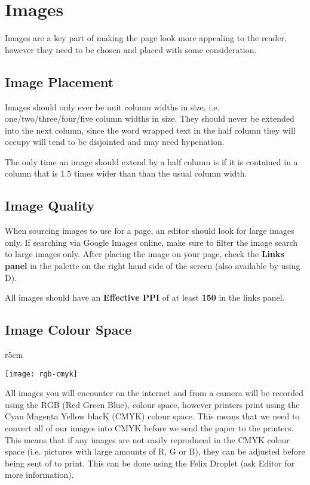 \chapter{Images}

Images are a key part of making the page look more appealing to the reader, however they need to be chosen and placed with some consideration.

\section{Image Placement}

Images should only ever be unit column widths in size, i.e. one/two/three/four/five column widths in size. They should never be extended into the next column, since the word wrapped text in the half column they will occupy will tend to be disjointed and may need hypenation.

The only time an image should extend by a half column is if it is contained in a column that is 1.5 times wider than than the usual column width. 

\section{Image Quality}

When sourcing images to use for a page, an editor should look for large images only. If searching via Google Images online, make sure to filter the image search to large images only. After placing the image on your page, check the \textbf{Links panel} in the palette on the right hand side of the screen (also available by using \shiftkey \cmdkey D).

All images should have an \textbf{Effective PPI} of at least \textbf{150} in the links panel.


\section{Image Colour Space}

\begin{wrapfigure}{r}{5cm}
\vspace{-22pt}
\begin{center}
\texttt{[image: rgb-cmyk]}
\end{center}
\vspace{-50pt}
\end{wrapfigure} 
All images you will encounter on the internet and from a camera will be recorded using the RGB (Red Green Blue), colour space, however printers print using the Cyan Magenta Yellow blacK (CMYK) colour space. This means that we need to convert all of our images into CMYK before we send the paper to the printers. This means that if any images are not easily reproduced in the CMYK colour space (i.e. pictures with large amounts of R, G or B), they can be adjusted before being sent of to print. This can be done using the Felix Droplet (ask Editor for more information).

